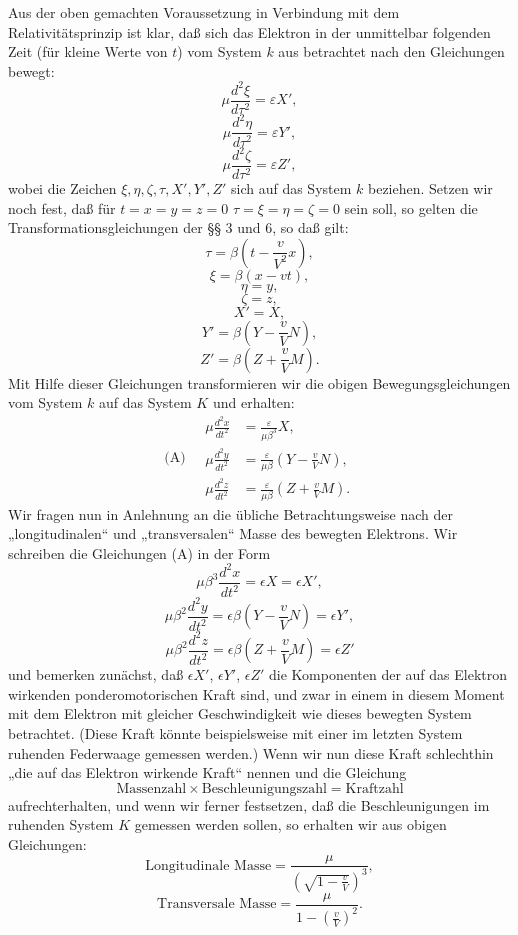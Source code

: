\documentclass[17pt]{webarticle}       %
\begin{document}
Aus der oben gemachten Voraussetzung in Verbindung mit dem Relativitätsprinzip ist klar, daß sich das Elektron in der unmittelbar folgenden Zeit (für kleine Werte von \( t \)) vom System \( k \) aus betrachtet nach den Gleichungen bewegt:
\[
\mu \frac{d^2 \xi}{d \tau^2} = \varepsilon X',
\]
\[
\mu \frac{d^2 \eta}{d \tau^2} = \varepsilon Y',
\]
\[
\mu \frac{d^2 \zeta}{d \tau^2} = \varepsilon Z',
\]
wobei die Zeichen \( \xi, \eta, \zeta, \tau, X', Y', Z' \) sich auf das System \( k \) beziehen. Setzen wir noch fest, daß für \( t = x = y = z = 0 \) \( \tau = \xi = \eta = \zeta = 0 \) sein soll, so gelten die Transformationsgleichungen der §§ 3 und 6, so daß gilt:
\[
\tau = \beta \left( t - \frac{v}{V^2} x \right),
\]
\[
\xi = \beta (x - vt),
\]
\[
\eta = y,
\]
\[
\zeta = z,
\]
\[
X' = X,
\]
\[
Y' = \beta \left( Y - \frac{v}{V} N \right),
\]
\[
Z' = \beta \left( Z + \frac{v}{V} M \right).
\]
Mit Hilfe dieser Gleichungen transformieren wir die obigen Bewegungsgleichungen vom System \( k \) auf das System \( K \) und erhalten:
\[
\text{(A)} \quad 
\begin{aligned}
\mu \frac{d^2 x}{dt^2} &= \frac{\varepsilon}{\mu \beta^3} X,\\
\mu \frac{d^2 y}{dt^2} &= \frac{\varepsilon}{\mu \beta} \left( Y - \frac{v}{V} N \right),\\
\mu \frac{d^2 z}{dt^2} &= \frac{\varepsilon}{\mu \beta} \left( Z + \frac{v}{V} M \right).
\end{aligned}
\]
Wir fragen nun in Anlehnung an die übliche Betrachtungsweise nach der „longitudinalen“ und „transversalen“ Masse des bewegten Elektrons. Wir schreiben die Gleichungen (A) in der Form
\[
\mu \beta^3 \frac{d^2x}{dt^2} = \epsilon X = \epsilon X', 
\]
\[
\mu \beta^2 \frac{d^2y}{dt^2} = \epsilon \beta \left( Y - \frac{v}{V} N \right) = \epsilon Y', 
\]
\[
\mu \beta^2 \frac{d^2z}{dt^2} = \epsilon \beta \left( Z + \frac{v}{V} M \right) = \epsilon Z'
\]
und bemerken zunächst, daß \(\epsilon X'\), \(\epsilon Y'\), \(\epsilon Z'\) die Komponenten der auf das Elektron wirkenden ponderomotorischen Kraft sind, und zwar in einem in diesem Moment mit dem Elektron mit gleicher Geschwindigkeit wie dieses bewegten System betrachtet. (Diese Kraft könnte beispielsweise mit einer im letzten System ruhenden Federwaage gemessen werden.) Wenn wir nun diese Kraft schlechthin „die auf das Elektron wirkende Kraft“ nennen und die Gleichung 
\[
\text{Massenzahl} \times \text{Beschleunigungszahl} = \text{Kraftzahl}
\]
aufrechterhalten, und wenn wir ferner festsetzen, daß die Beschleunigungen im ruhenden System \( K \) gemessen werden sollen, so erhalten wir aus obigen Gleichungen:
\[
\text{Longitudinale Masse} = \frac{\mu}{\left( \sqrt{1 - \frac{v}{V}} \right)^3},
\]
\[
\text{Transversale Masse} = \frac{\mu}{1 - \left( \frac{v}{V} \right)^2}.
\]
\end{document}
